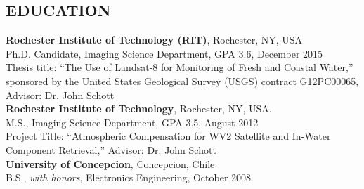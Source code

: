 \documentclass[11pt]{res} %
\begin{document}
\begin{resume}
\vspace{-0.3in}                                         
\section{EDUCATION}
\vspace{0.1in}
{\bf Rochester Institute of Technology (RIT)}, Rochester, NY, USA\\
Ph.D. Candidate, Imaging Science Department, GPA 3.6, December 2015\\
Thesis title: ``The Use of Landsat-8 for Monitoring of Fresh and Coastal Water,'' sponsored by the United States Geological Survey (USGS) contract G12PC00065, Advisor: Dr. John Schott
\vspace{0.1in}\\
{\bf Rochester Institute of Technology}, Rochester, NY, USA.\\
M.S., Imaging Science Department, GPA 3.5, August 2012\\
Project Title: ``Atmospheric Compensation for WV2 Satellite and In-Water Component Retrieval,'' Advisor: Dr. John Schott
\vspace{0.1in}\\
{\bf University of Concepcion}, Concepcion, Chile \\
B.S., {\it with honors}, Electronics Engineering, October 2008\\

\vspace{-0.1in}

\end{resume}
\end{document}
